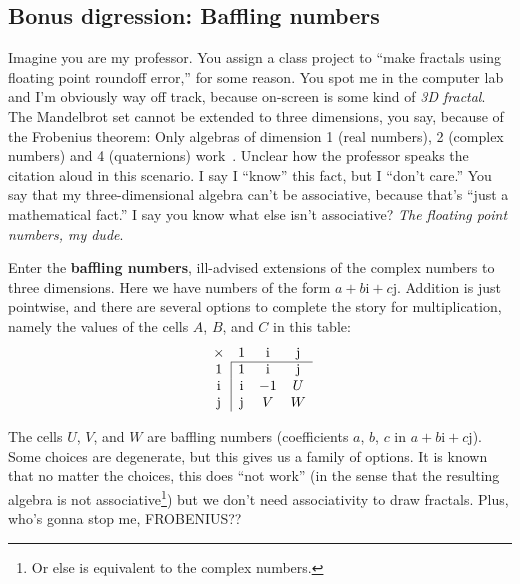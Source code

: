 \documentclass[twocolumn]{article}
\begin{document}
\subsection{Bonus digression: Baffling numbers}
Imagine you are my professor. You assign a class project to ``make
fractals using floating point roundoff error,'' for some reason. You
spot me in the computer lab and I'm obviously way off track, because
on-screen is some kind of {\Large \it 3D fractal}. The Mandelbrot set cannot
be extended to three dimensions, you say, because of the Frobenius
theorem: Only algebras of dimension 1 (real numbers), 2 (complex
numbers) and 4 (quaternions) work~\cite{frobenius1878lineare}. Unclear
how the professor speaks the citation aloud in this scenario. I say I
``know'' this fact, but I ``don't care.'' You say that my
three-dimensional algebra can't be associative, because that's ``just
a mathematical fact.'' I say you know what else isn't associative?
{\em The floating point numbers, my dude}.

Enter the {\bf baffling numbers}, ill-advised extensions of the
complex numbers to three dimensions. Here we have numbers of the form
$a + b\mathrm{i} + c\mathrm{j}$. Addition is just pointwise, and there
are several options to complete the story for multiplication, namely
the values of the cells $A$, $B$, and $C$ in this table:
%
\[
\begin{array}{c|ccc}
  \multicolumn{1}{c}{\times} & 1          &  \mathrm{i} & \mathrm{j} \\
  \cline{2-4}
  1          & 1          &  \mathrm{i} & \mathrm{j} \\
  \mathrm{i} & \mathrm{i} & -1          & U \\
  \mathrm{j} & \mathrm{j} &  V          & W \\
\end{array}
\]




The cells $U$, $V$, and $W$ are baffling numbers (coefficients $a$,
$b$, $c$ in $a + b\mathrm{i} + c\mathrm{j}$). Some choices are
degenerate, but this gives us a family of options. It is known that no
matter the choices, this does ``not work'' (in the sense that the
resulting algebra is not associative\footnote{Or else is equivalent to
  the complex numbers.}) but we don't need associativity to draw
fractals. Plus, who's gonna stop me, FROBENIUS??
\end{document}

